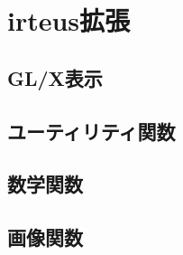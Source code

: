 \section{irteus拡張}
 \subsection{GL/X表示}
  
  
 \subsection{ユーティリティ関数}
 
 \subsection{数学関数}
 
 \subsection{画像関数}
 
 
